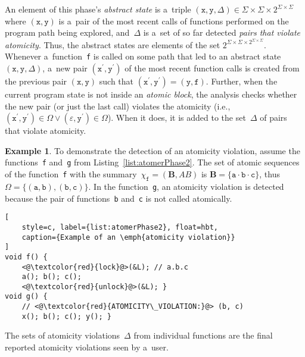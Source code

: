 \documentclass{ExcelAtFIT}
\theoremstyle{definition}
\newtheorem{example}{Example}[section]
\begin{document}
An element of this phase's \emph{abstract state} is a~triple $ {(\mathtt{x}, \mathtt{y}, \Delta)} \in \Sigma \times \Sigma \times 2^{\Sigma \times \Sigma} $ where $ {(\mathtt{x}, \mathtt{y})} $ is a~pair of the most recent calls of functions performed on the program path being explored, and~$ \Delta $ is a~set of so far detected \emph{pairs that violate atomicity}. Thus, the abstract states are elements of the set $ 2^{\Sigma \times \Sigma \times 2^{\Sigma \times \Sigma}} $. Whenever a~function~\texttt{f} is called on some path that led to an abstract state ${ (\mathtt{x}, \mathtt{y}, \Delta) }$, a~new pair ${ (\mathtt{x}^\prime, \mathtt{y}^\prime) }$ of the most recent function calls is created from the previous pair ${ (\mathtt{x}, \mathtt{y}) }$ such that $ {(\mathtt{x}^\prime, \mathtt{y}^\prime)} = {(\mathtt{y}, \mathtt{f})} $. Further, when the current program state is not inside an \emph{atomic block}, the analysis checks whether the new pair (or just the last call) violates the atomicity (i.e., $ {(\mathtt{x}^\prime, \mathtt{y}^\prime)} \in \Omega \vee {(\varepsilon, \mathtt{y}^\prime)} \in \Omega $). When it does, it is added to the set~$ \Delta $ of pairs that violate atomicity.

\begin{example}
    \sloppy
    To demonstrate the detection of an atomicity violation, assume the functions~\texttt{f} and~\texttt{g} from Listing~\ref{list:atomerPhase2}. The set of atomic sequences of the function~\texttt{f} with the summary~$ \chi_\mathtt{f} = (\boldsymbol{B}, AB) $ is $ \boldsymbol{B} = \{\mathtt{a} \cdot \mathtt{b} \cdot \mathtt{c}\} $, thus $ \Omega = \{{(\mathtt{a, b})}, {(\mathtt{b, c})}\} $. In the function~\texttt{g}, an atomicity violation is detected because the pair of functions~\texttt{b} and~\texttt{c} is not called atomically.
\end{example}

\begin{lstlisting}[
    style=c, label={list:atomerPhase2}, float=hbt,
    caption={Example of an \emph{atomicity violation}}
]
void f() {
    <@\textcolor{red}{lock}@>(&L); // a.b.c
    a(); b(); c();
    <@\textcolor{red}{unlock}@>(&L); }
void g() {
    // <@\textcolor{red}{ATOMICITY\_VIOLATION:}@> (b, c)
    x(); b(); c(); y(); }
\end{lstlisting}

The sets of atomicity violations~$ \Delta $ from individual functions are the final reported atomicity violations seen by a~user.


\end{document}
